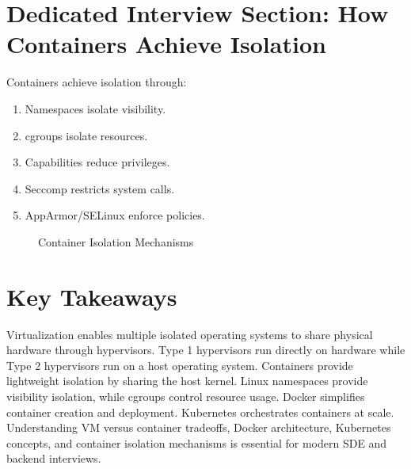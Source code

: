 \section{Dedicated Interview Section: How Containers Achieve Isolation}

Containers achieve isolation through:

\begin{enumerate}
\item Namespaces isolate visibility.
\item cgroups isolate resources.
\item Capabilities reduce privileges.
\item Seccomp restricts system calls.
\item AppArmor/SELinux enforce policies.
\end{enumerate}

\begin{figure}[H]
\centering
{}
\caption{Container Isolation Mechanisms}
\end{figure}

\section{Key Takeaways}

\begin{keytakeaways}
Virtualization enables multiple isolated operating systems to share physical hardware through hypervisors. Type 1 hypervisors run directly on hardware while Type 2 hypervisors run on a host operating system. Containers provide lightweight isolation by sharing the host kernel. Linux namespaces provide visibility isolation, while cgroups control resource usage. Docker simplifies container creation and deployment. Kubernetes orchestrates containers at scale. Understanding VM versus container tradeoffs, Docker architecture, Kubernetes concepts, and container isolation mechanisms is essential for modern SDE and backend interviews.
\end{keytakeaways}

